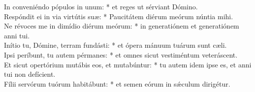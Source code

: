 {	In conveniéndo pópulos in unum: * et reges ut sérviant Dómino. \\
	Respóndit ei in via virtútis suæ: * Paucitátem diérum meórum núntia mihi. \\
	Ne révoces me in dimídio diérum meórum: * in generatiónem et generatiónem anni tui. \\
	Inítio tu, Dómine, terram fundásti: * et ópera mánuum tuárum sunt cæli. \\
	Ipsi períbunt, tu autem pérmanes: * et omnes sicut vestiméntum veteráscent. \\
	Et sicut opertórium mutábis eos, et mutabúntur: * tu autem idem ipse es, et anni tui non defícient. \\
	Fílii servórum tuórum habitábunt: * et semen eórum in sǽculum dirigétur. \\
}

